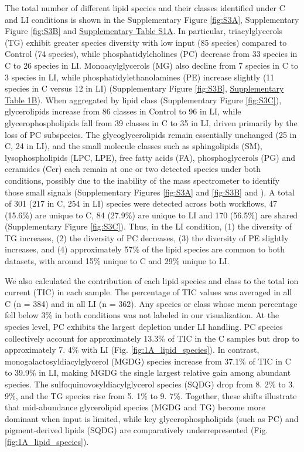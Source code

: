 \documentclass[10pt,letterpaper]{article}
\begin{document}
The total number of different lipid species and their classes identified under C and LI conditions is shown in the Supplementary Figure \ref{fig:S3A}, Supplementary Figure \ref{fig:S3B} and  \href{https://docs.google.com/spreadsheets/d/1SB90-QLYheKEzmHCUIh1UfgkrtbL064s8Oo5BfwFaV0/edit?gid=1876149577#gid=1876149577}{Supplementary Table S1A}. In particular, triacylglycerols (TG) exhibit greater species diversity with low input (85 species) compared to Control (74 species), while phosphatidylcholines (PC) decrease from 33 species in C to 26 species in LI. Monoacylglycerols (MG) also decline from 7 species in C to 3 species in LI, while phosphatidylethanolamines (PE) increase slightly (11 species in C versus 12 in LI) (Supplementary Figure \ref{fig:S3B}, \href{https://docs.google.com/spreadsheets/d/1SB90-QLYheKEzmHCUIh1UfgkrtbL064s8Oo5BfwFaV0/edit?gid=1876149577#gid=1876149577}{Supplementary Table 1B}). When aggregated by lipid class (Supplementary Figure \ref{fig:S3C}), glycerolipids increase from 86 classes in Control to 96 in LI, while glycerophospholipids fall from 39 classes in C to 35 in LI, driven primarily by the loss of PC subspecies. The glycoglycerolipids remain essentially unchanged (25 in C, 24 in LI), and the small molecule classes such as sphingolipids (SM), lysophospholipids (LPC, LPE), free fatty acids (FA), phosphoglycerols (PG) and ceramides (Cer) each remain at one or two detected species under both conditions, possibly due to the inability of the mass spectrometer to identify those small signals (Supplementary Figures \ref{fig:S3A} and \ref{fig:S3B} and ). A total of 301 (217 in C, 254 in LI) species were detected across both workflows, 47 (15.6\%) are unique to C, 84 (27.9\%) are unique to LI and 170 (56.5\%) are shared (Supplementary Figure \ref{fig:S3C}). Thus, in the LI condition, (1) the diversity of TG increases, (2) the diversity of PC decreases, (3) the diversity of PE slightly increases, and (4) approximately 57\% of the lipid species are common to both datasets, with around 15\% unique to C and 29\% unique to LI.

We also calculated the contribution of each lipid species and class to the total ion current (TIC) in each sample. The percentage of TIC values was averaged in all C (n = 384) and in all LI (n = 362). Any species or class whose mean percentage fell below 3\% in both conditions was not labeled in our visualization. At the species level, PC exhibits the largest depletion under LI handling. PC species collectively account for approximately 13.3\% of TIC in the C samples but drop to approximately 7. 4\% with LI (Fig. \ref{fig:1A_lipid_species}). In contrast, monogalactosyldiacylglycerol (MGDG) species increase from 37.1\% of TIC in C to 39.9\% in LI, making MGDG the single largest relative gain among abundant species. The sulfoquinovosyldiacylglycerol species (SQDG) drop from 8. 2\% to 3. 9\%, and the TG species rise from 5. 1\% to 9. 7\%. Together, these shifts illustrate that mid-abundance glycerolipid species (MGDG and TG) become more dominant when input is limited, while key glycerophospholipids (such as PC) and pigment‐derived lipids (SQDG) are comparatively underrepresented (Fig. \ref{fig:1A_lipid_species}).
\end{document}
